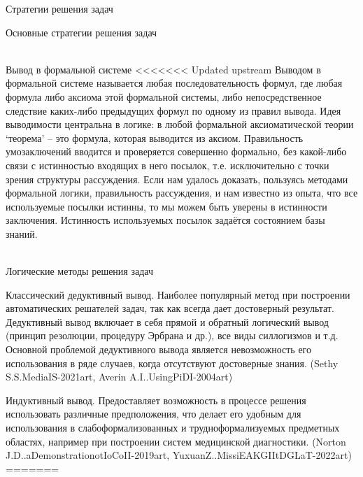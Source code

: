 \begin{frame}{Стратегии решения задач}
\begin{frame}{\large Основные стратегии решения задач}
\begin{textitemize}
\begin{frame}{\\Вывод в формальной системе}
<<<<<<< Updated upstream
    \vspace{10mm}
        Выводом в формальной системе называется любая последовательность формул, где любая формула либо аксиома этой формальной системы, либо непосредственное следствие каких-либо предыдущих формул по одному из правил вывода. Идея выводимости центральна в логике: в любой формальной аксиоматической теории ‘теорема’ – это формула, которая выводится из аксиом. Правильность умозаключений вводится и проверяется совершенно формально, без какой-либо связи с истинностью входящих в него посылок, т.е. исключительно с точки зрения структуры рассуждения. Если нам удалось доказать, пользуясь методами формальной логики, правильность рассуждения, и нам известно из опыта, что все используемые посылки истинны, то мы можем быть уверены в истинности заключения. Истинность используемых посылок задаётся состоянием базы знаний.
\end{frame}

\begin{frame}{\\Логические методы решения задач}
    \vspace{10mm}
    \begin{textitemize}
        \item Классический дедуктивный вывод. Наиболее популярный метод при построении автоматических решателей задач, так как всегда дает достоверный результат. Дедуктивный вывод включает в себя прямой и обратный логический вывод (принцип резолюции, процедуру Эрбрана и др.), все виды силлогизмов и т.д. Основной проблемой дедуктивного вывода является невозможность его использования в ряде случаев, когда отсутствуют достоверные знания. (Sethy S.S.MediaIS-2021art, Averin A.I..UsingPiDI-2004art)
        \item Индуктивный вывод. Предоставляет возможность в процессе решения использовать различные предположения, что делает его удобным для использования в слабоформализованных и трудноформализуемых предметных областях, например при построении систем медицинской диагностики. (Norton J.D..aDemonstrationotIoCoII-2019art, YuxuanZ..MissiEAKGIItDGLaT-2022art)
=======
\topline
    \vspace{10}
     \\
     

\end{textitemize}
\end{frame}
\end{textitemize}
\end{frame}
\end{frame}
